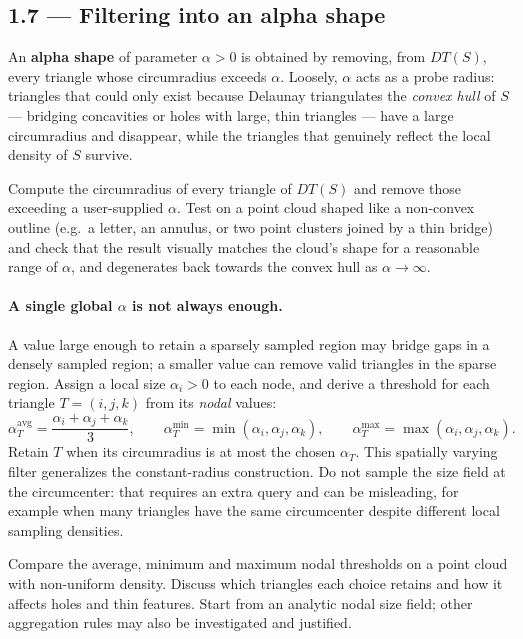 \documentclass[11pt,a4paper]{article}
\begin{document}
\subsection*{1.7 --- Filtering into an alpha shape}

An \textbf{alpha shape} of parameter $\alpha>0$ is obtained by removing,
from $DT(S)$, every triangle whose circumradius exceeds $\alpha$. Loosely,
$\alpha$ acts as a probe radius: triangles that could only exist because
Delaunay triangulates the \emph{convex hull} of $S$ --- bridging concavities
or holes with large, thin triangles --- have a large circumradius and
disappear, while the triangles that genuinely reflect the local density of
$S$ survive.

\begin{task}
Compute the circumradius of every triangle of $DT(S)$ and remove those
exceeding a user-supplied $\alpha$. Test on a point cloud shaped like a
non-convex outline (e.g.\ a letter, an annulus, or two point clusters joined
by a thin bridge) and check that the result visually matches the cloud's
shape for a reasonable range of $\alpha$, and degenerates back towards the
convex hull as $\alpha\to\infty$.
\end{task}

\paragraph{A single global $\alpha$ is not always enough.} A value large
enough to retain a sparsely sampled region may bridge gaps in a densely
sampled region; a smaller value can remove valid triangles in the sparse
region. Assign a local size $\alpha_i>0$ to each node, and derive a threshold
for each triangle $T=(i,j,k)$ from its \emph{nodal} values:
\[
 \alpha_T^{\mathrm{avg}}=\frac{\alpha_i+\alpha_j+\alpha_k}{3},\qquad
 \alpha_T^{\min}=\min(\alpha_i,\alpha_j,\alpha_k),\qquad
 \alpha_T^{\max}=\max(\alpha_i,\alpha_j,\alpha_k).
\]
Retain $T$ when its circumradius is at most the chosen $\alpha_T$.
This spatially varying filter generalizes the constant-radius construction.
Do not sample the size field at the circumcenter: that requires an extra
query and can be misleading, for example when many triangles have the same
circumcenter despite different local sampling densities.

\begin{task}
Compare the average, minimum and maximum nodal thresholds on a point cloud
with non-uniform density. Discuss which triangles each choice retains and
how it affects holes and thin features. Start from an analytic nodal size
field; other aggregation rules may also be investigated and justified.
\end{task}
\end{document}
